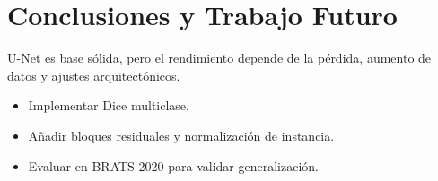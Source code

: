 \chapter{Conclusiones y Trabajo Futuro}

U-Net es base sólida, pero el rendimiento depende de la pérdida,
aumento de datos y ajustes arquitectónicos.

\begin{itemize}
  \item Implementar Dice multiclase.
  \item Añadir bloques residuales y normalización de instancia.
  \item Evaluar en BRATS 2020 para validar generalización.
\end{itemize}
